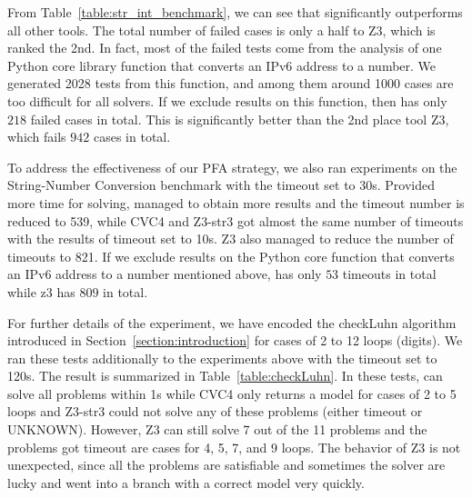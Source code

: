 From Table~\ref{table:str_int_benchmark}, we can see that {\tool} significantly outperforms all other tools. The total number of failed cases is only a half to Z3, which is ranked the 2nd. In fact, most of the failed tests come from the analysis of one Python core library function that converts an IPv6 address to a number. We generated 2028 tests from this function, and among them around 1000 cases  are too difficult for all solvers.  If we exclude results on this function, then {\tool} has only $218$ failed cases in total. This is significantly better than the 2nd place tool Z3, which fails $942$ cases in total.

To address the effectiveness of our PFA strategy, we also ran experiments on the String-Number Conversion benchmark with the timeout set to 30s. Provided more time for solving, {\tool} managed to obtain more results and the timeout number is reduced to 539, while CVC4 and Z3-str3 got almost the same number of timeouts with the results of timeout set to 10s. Z3 also managed to reduce the number of timeouts to 821. If we exclude results on the Python core function that converts an IPv6 address to a number mentioned above, {\tool} has only $53$ timeouts in total while z3 has $809$ in total.

For further details of the experiment, we have encoded the checkLuhn algorithm introduced in Section~\ref{section:introduction} for cases of 2 to 12 loops (digits). We ran these tests additionally to the experiments above with the timeout set to 120s. The result is summarized in Table~\ref{table:checkLuhn}.
In these tests, {\tool} can solve all problems within 1s while CVC4 only returns a model for cases of 2 to 5 loops and Z3-str3 could not solve any of these problems (either timeout or UNKNOWN). However, Z3 can still solve 7 out of the 11 problems and the problems got timeout are cases for 4, 5, 7, and 9 loops. The behavior of Z3 is not unexpected, since all the problems are satisfiable and sometimes the solver are lucky and went into a branch with a correct model very quickly.



